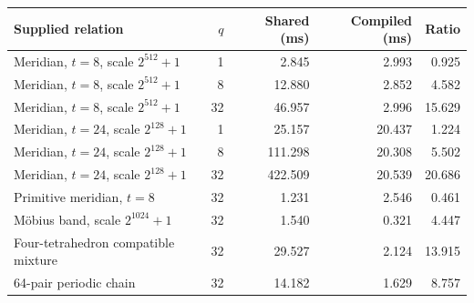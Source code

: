 \begingroup
\small
\setlength{\tabcolsep}{5pt}
\renewcommand{\arraystretch}{1.12}
\begin{tabular}{@{}p{6.5cm}rrrr@{}}
\toprule
Supplied relation & $q$ & Shared (ms) & Compiled (ms) & Ratio \\
\midrule
Meridian, $t=8$, scale $2^{512}+1$ & 1 & 2.845 & 2.993 & 0.925 \\
Meridian, $t=8$, scale $2^{512}+1$ & 8 & 12.880 & 2.852 & 4.582 \\
Meridian, $t=8$, scale $2^{512}+1$ & 32 & 46.957 & 2.996 & 15.629 \\
Meridian, $t=24$, scale $2^{128}+1$ & 1 & 25.157 & 20.437 & 1.224 \\
Meridian, $t=24$, scale $2^{128}+1$ & 8 & 111.298 & 20.308 & 5.502 \\
Meridian, $t=24$, scale $2^{128}+1$ & 32 & 422.509 & 20.539 & 20.686 \\
Primitive meridian, $t=8$ & 32 & 1.231 & 2.546 & 0.461 \\
M\"obius band, scale $2^{1024}+1$ & 32 & 1.540 & 0.321 & 4.447 \\
Four-tetrahedron compatible mixture & 32 & 29.527 & 2.124 & 13.915 \\
64-pair periodic chain & 32 & 14.182 & 1.629 & 8.757 \\
\bottomrule
\end{tabular}
\endgroup

